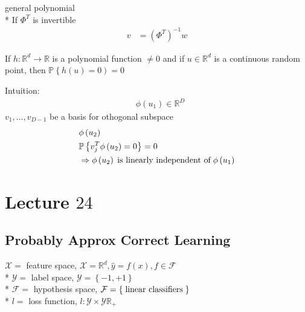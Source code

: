 \documentclass{article}
\begin{document}
general polynomial
\\* If $\Phi^{T}$ is invertible
\begin{align*}
v  &= \left(\Phi^{T}\right)^{-1} w 
\end{align*}
\begin{lem} \label{lem:polyf} 
If $h  : \mathbb{R}^{d} \to  \mathbb{R}$ is a polynomial function $\neq  0$ and if $u  \in \mathbb{R}^{d}$ is a continuous random point, then $\mathbb{P}\left\{h\left(u\right) = 0\right) = 0$
\end{lem}
Intuition:
\begin{align*}
&\phi\left(u_{1}\right) \in \mathbb{R}^{D}
\end{align*}
$v_{1}, ..., v_{D-1}$ be a basis for othogonal subspace
\begin{align*}
&  \phi\left(u_{2}\right)
\\ &  \mathbb{P}\left\{v_{j}^{T} \phi\left(u_{2}\right) = 0\right\} = 0
\\ &\Rightarrow  \phi\left(u_{2}\right) \text{\;is linearly independent of\;} \phi\left(u_{1}\right)
\end{align*}





\section{Lecture $24$} 

\subsection{Probably Approx Correct Learning}
$\mathcal{X} =$ feature space, $\mathcal{X} = \mathbb{R}^{d}, \hat{y} = f\left(x\right), f \in \mathcal{F}$
\\* $\mathcal{Y} =$ label space, $\mathcal{Y} = \left\{-1, +1\right\}$
\\* $\mathcal{F} =$ hypothesis space, $\mathcal{F} = \left\{\text{\;linear classifiers\;}\right\}$
\\* $l  =$ loss function, $l  : \mathcal{Y} \times \mathcal{Y} \mathbb{R}_{+}$
\end{document}
